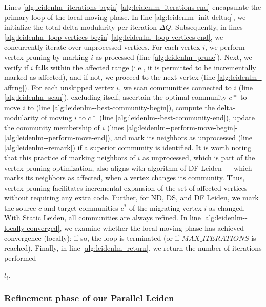 Lines \ref{alg:leidenlm--iterations-begin}-\ref{alg:leidenlm--iterations-end} encapsulate the primary loop of the local-moving phase. In line \ref{alg:leidenlm--init-deltaq}, we initialize the total delta-modularity per iteration $\Delta Q$. Subsequently, in lines \ref{alg:leidenlm--loop-vertices-begin}-\ref{alg:leidenlm--loop-vertices-end}, we concurrently iterate over unprocessed vertices. For each vertex $i$, we perform vertex pruning by marking $i$ as processed (line \ref{alg:leidenlm--prune}). Next, we verify if $i$ falls within the affected range (i.e., it is permitted to be incrementally marked as affected), and if not, we proceed to the next vertex (line \ref{alg:leidenlm--affrng}). For each unskipped vertex $i$, we scan communities connected to $i$ (line \ref{alg:leidenlm--scan}), excluding itself, ascertain the optimal community $c*$ to move $i$ to (line \ref{alg:leidenlm--best-community-begin}), compute the delta-modularity of moving $i$ to $c*$ (line \ref{alg:leidenlm--best-community-end}), update the community membership of $i$ (lines \ref{alg:leidenlm--perform-move-begin}-\ref{alg:leidenlm--perform-move-end}), and mark its neighbors as unprocessed (line \ref{alg:leidenlm--remark}) if a superior community is identified. It is worth noting that this practice of marking neighbors of $i$ as unprocessed, which is part of the vertex pruning optimization, also aligns with algorithm of DF Leiden --- which marks its neighbors as affected, when a vertex changes its community. Thus, vertex pruning facilitates incremental expansion of the set of affected vertices without requiring any extra code. Further, for ND, DS, and DF Leiden, we mark the source $c$ and target communities $c^*$ of the migrating vertex $i$ as changed. With Static Leiden, all communities are always refined. In line \ref{alg:leidenlm--locally-converged}, we examine whether the local-moving phase has achieved convergence (locally); if so, the loop is terminated (or if $MAX\_ITERATIONS$ is reached). Finally, in line \ref{alg:leidenlm--return}, we return the number of iterations performed $l_i$.


\subsubsection{Refinement phase of our Parallel Leiden}

